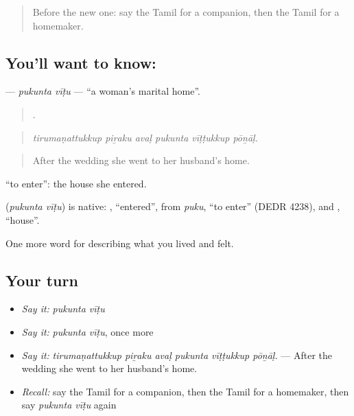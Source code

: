 \label{lesson:TA-C500-pukunta-vitu}



\begin{quote}
Before the new one: say the Tamil for a companion, then the Tamil for a homemaker.
\end{quote}

\subsection*{You'll want to know:  }
\textbf{ } — \emph{pukunta vīṭu} — \textquotedblleft{}a woman’s marital home\textquotedblright{}.

\begin{quote}
     .
\end{quote}

\begin{quote}
\emph{tirumaṇattukkup piṟaku avaḷ pukunta vīṭṭukkup pōṉāḷ.}
\end{quote}

\begin{quote}
After the wedding she went to her husband’s home.
\end{quote}

 \textquotedblleft{}to enter\textquotedblright{}: the house she entered.

\begin{cousinweb}
\textbf{ } (\emph{pukunta vīṭu}) is native: , \textquotedblleft{}entered\textquotedblright{}, from  \emph{puku}, \textquotedblleft{}to enter\textquotedblright{} (DEDR 4238), and , \textquotedblleft{}house\textquotedblright{}.
\end{cousinweb}

\begin{grammarlens}[title={What you've built}]
One more word for describing what you lived and felt.
\end{grammarlens}

\subsection*{Your turn}
\begin{itemize}
\raggedright
  \item \emph{Say it:} \emph{pukunta vīṭu}
  \item \emph{Say it:} \emph{pukunta vīṭu}, once more
  \item \emph{Say it:} \emph{tirumaṇattukkup piṟaku avaḷ pukunta vīṭṭukkup pōṉāḷ.} — After the wedding she went to her husband’s home.
  \item \emph{Recall:} say the Tamil for a companion, then the Tamil for a homemaker, then say \emph{pukunta vīṭu} again
\end{itemize}

